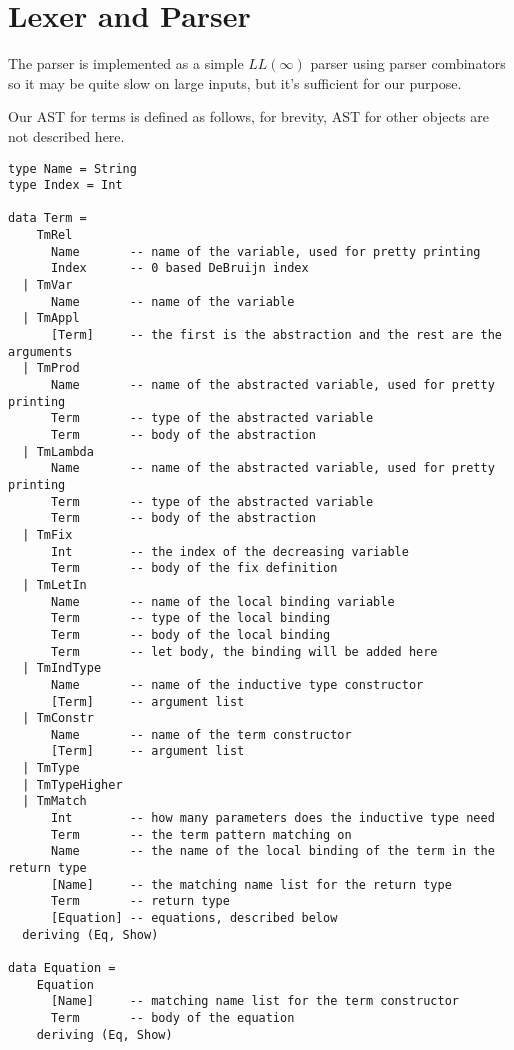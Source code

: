 \section{Lexer and Parser}
The parser is implemented as a simple $LL(\infty)$ parser using parser combinators so it may be quite slow on large inputs, but it's sufficient
for our purpose.

Our AST for terms is defined as follows, for brevity, AST for other objects are not described here.

\begin{center}
\begin{verbatim}
type Name = String
type Index = Int

data Term =
    TmRel
      Name       -- name of the variable, used for pretty printing
      Index      -- 0 based DeBruijn index
  | TmVar
      Name       -- name of the variable
  | TmAppl
      [Term]     -- the first is the abstraction and the rest are the arguments
  | TmProd
      Name       -- name of the abstracted variable, used for pretty printing
      Term       -- type of the abstracted variable
      Term       -- body of the abstraction
  | TmLambda
      Name       -- name of the abstracted variable, used for pretty printing
      Term       -- type of the abstracted variable
      Term       -- body of the abstraction
  | TmFix
      Int        -- the index of the decreasing variable
      Term       -- body of the fix definition
  | TmLetIn
      Name       -- name of the local binding variable
      Term       -- type of the local binding
      Term       -- body of the local binding
      Term       -- let body, the binding will be added here
  | TmIndType
      Name       -- name of the inductive type constructor
      [Term]     -- argument list
  | TmConstr
      Name       -- name of the term constructor
      [Term]     -- argument list
  | TmType
  | TmTypeHigher
  | TmMatch
      Int        -- how many parameters does the inductive type need
      Term       -- the term pattern matching on
      Name       -- the name of the local binding of the term in the return type
      [Name]     -- the matching name list for the return type
      Term       -- return type
      [Equation] -- equations, described below
  deriving (Eq, Show)

data Equation =
    Equation
      [Name]     -- matching name list for the term constructor
      Term       -- body of the equation
    deriving (Eq, Show)
\end{verbatim}
\end{center}
